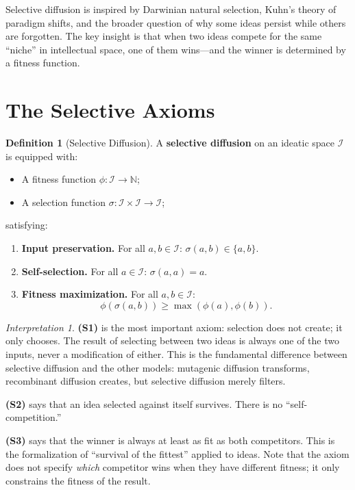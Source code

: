 \documentclass[11pt,openany]{book}
\theoremstyle{definition}
\newtheorem{definition}[axiom]{Definition}
\theoremstyle{plain}
\theoremstyle{remark}
\newtheorem{interpretation}[axiom]{Interpretation}
\newcommand{\IS}{\mathcal{I}}               %
\begin{document}
Selective diffusion is inspired by Darwinian natural selection, Kuhn's theory of paradigm shifts, and the broader question of why some ideas persist while others are forgotten. The key insight is that when two ideas compete for the same ``niche'' in intellectual space, one of them wins---and the winner is determined by a fitness function.

\section{The Selective Axioms}

\begin{definition}[Selective Diffusion]
\label{def:selective}
A \textbf{selective diffusion} on an ideatic space $\IS$ is equipped with:
\begin{itemize}
\item A fitness function $\phi : \IS \to \mathbb{N}$;
\item A selection function $\sigma : \IS \times \IS \to \IS$;
\end{itemize}
satisfying:
\begin{enumerate}
\item[\textbf{(S1)}] \textbf{Input preservation.} For all $a, b \in \IS$: $\sigma(a, b) \in \{a, b\}$.
\item[\textbf{(S2)}] \textbf{Self-selection.} For all $a \in \IS$: $\sigma(a, a) = a$.
\item[\textbf{(S3)}] \textbf{Fitness maximization.} For all $a, b \in \IS$:
\[ \phi(\sigma(a, b)) \geq \max(\phi(a), \phi(b)). \]
\end{enumerate}
\end{definition}

\begin{interpretation}
\textbf{(S1)} is the most important axiom: selection does not create; it only chooses. The result of selecting between two ideas is always one of the two inputs, never a modification of either. This is the fundamental difference between selective diffusion and the other models: mutagenic diffusion transforms, recombinant diffusion creates, but selective diffusion merely filters.

\textbf{(S2)} says that an idea selected against itself survives. There is no ``self-competition.''

\textbf{(S3)} says that the winner is always at least as fit as both competitors. This is the formalization of ``survival of the fittest'' applied to ideas. Note that the axiom does not specify \emph{which} competitor wins when they have different fitness; it only constrains the fitness of the result.
\end{interpretation}
\end{document}
